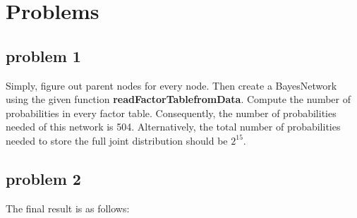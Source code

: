 \documentclass[aps,letterpaper,10pt]{revtex4}
\begin{document}
\section{Problems}
\subsection{problem 1}
Simply, figure out parent nodes for every node. Then create a BayesNetwork using the given function \textbf{readFactorTablefromData}.
Compute the number of probabilities in every factor table.
Consequently, the number of probabilities needed of this network is 504. Alternatively, the total number of probabilities needed to store the full joint distribution should be $2^{15}$.
\subsection{problem 2}
The final result is as follows:
\end{document}
